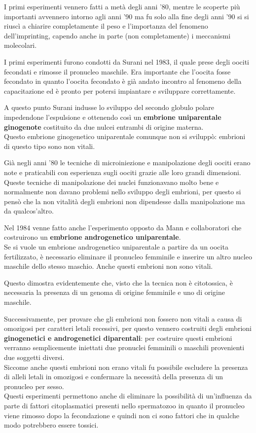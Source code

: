 \documentclass[11pt]{book}
\begin{document}
I primi esperimenti vennero fatti a metà degli anni '80, mentre le scoperte più importanti avvennero intorno agli anni '90 ma fu solo alla fine degli anni '90 si si riuscì a chiarire completamente il peso e l’importanza del fenomeno dell’imprinting, capendo anche in parte (non completamente) i meccanismi molecolari.

I primi esperimenti furono condotti da Surani nel 1983, il quale prese degli oociti fecondati e rimosse il pronucleo maschile. Era importante che l'oocita fosse fecondato in quanto l'oocita fecondato è già andato incontro al fenomeno della capacitazione ed è pronto per potersi impiantare e sviluppare correttamente. 

A questo punto Surani indusse lo sviluppo del secondo globulo polare impedendone l'espulsione e ottenendo così un \textbf{embrione uniparentale ginogenote} costituito da due nulcei entrambi di origine materna.\\
Questo embrione ginogenetico uniparentale comunque non si sviluppò: embrioni di questo tipo sono non vitali.

Già negli anni '80 le tecniche di microiniezione e manipolazione degli oociti erano note e praticabili con esperienza sugli oociti grazie alle loro grandi dimensioni. Queste tecniche di manipolazione dei nuclei funzionavano molto bene e normalmente non davano problemi nello sviluppo degli embrioni, per questo si pensò che la non vitalità degli embrioni non dipendesse dalla manipolazione ma da qualcos'altro.

Nel 1984 venne fatto anche l'esperimento opposto da Mann e collaboratori che costruirono un \textbf{embrione androgenetico uniparentale}.\\
Se si vuole un embrione androgenetico uniparentale a partire da un oocita fertilizzato, è necessario eliminare il pronucleo femminile e inserire un altro nucleo maschile dello stesso maschio. Anche questi embrioni non sono vitali. 

Questo dimostra evidentemente che, visto che la tecnica non è citotossica, è necessaria la presenza di un genoma di origine femminile e uno di origine maschile.

Successivamente, per provare che gli embrioni non fossero non vitali a causa di omozigosi per caratteri letali recessivi, per questo vennero costruiti degli embrioni \textbf{ginogenetici e androgenetici diparentali}: per costruire questi embrioni verranno semplicemente iniettati due pronuclei femminili o maschili provenienti due soggetti diversi.\\
Siccome anche questi embrioni non erano vitali fu possibile escludere la presenza di alleli letali in omozigosi e confermare la necessità della presenza di un pronucleo per sesso.\\
Questi esperimenti permettono anche di eliminare la possibilità di un'influenza da parte di fattori citoplasmatici presenti nello spermatozoo in quanto il pronucleo viene rimosso dopo la fecondazione e quindi non ci sono fattori che in qualche modo potrebbero essere tossici.
\end{document}
